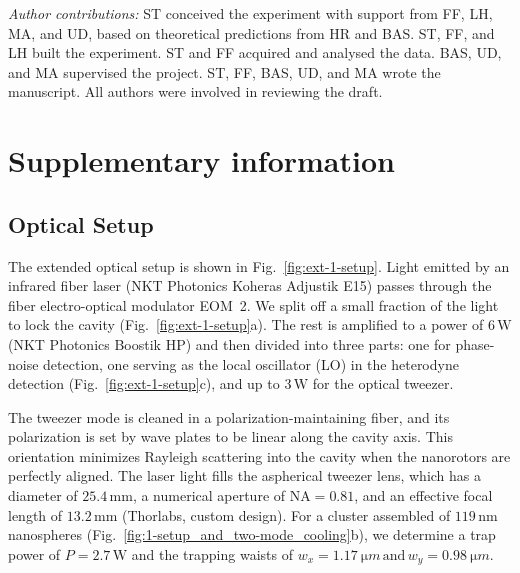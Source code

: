 \documentclass[reprint, amsmath, amssymb, superscriptaddress,showkeys,aps,pra]{revtex4-2}
\begin{document}
\noindent
\textit{Author contributions:}
ST conceived the experiment with support from FF, LH, MA, and UD, based on theoretical predictions from HR and BAS. ST, FF, and LH built the experiment. ST and FF acquired and analysed the data. BAS, UD, and MA supervised the project. ST, FF, BAS, UD, and MA wrote the manuscript. All authors were involved in reviewing the draft.
  





\onecolumngrid
\newpage
\section*{Supplementary information}

\subsection{Optical Setup}
The extended optical setup is shown in Fig.~\ref{fig:ext-1-setup}. 
Light emitted by an infrared fiber laser (NKT Photonics Koheras Adjustik E15) passes through the fiber electro-optical modulator EOM~2. 
We split off a small fraction of the light to lock the cavity (Fig.~\ref{fig:ext-1-setup}a). The rest is amplified to a power of $6\,\text{W}$ (NKT Photonics Boostik HP) and then divided into three parts:  one for phase-noise detection, one serving as the local oscillator (LO) in the heterodyne detection (Fig.~\ref{fig:ext-1-setup}c), and up to $3\,\text{W}$ for the optical tweezer.

The tweezer mode is cleaned in a polarization-maintaining fiber, and its polarization is set by wave plates to be linear along the cavity axis. This orientation minimizes Rayleigh scattering into the cavity when the nanorotors are perfectly aligned. The laser light fills the aspherical tweezer lens, which has a 
diameter of $25.4\,\text{mm}$, a numerical aperture of $\text{NA} =0.81$, and an effective focal length of $13.2\,\text{mm}$ (Thorlabs, custom design). For a cluster assembled of $119\,\text{nm}$ nanospheres (Fig.~\ref{fig:1-setup_and_two-mode_cooling}b), we determine a trap power of $P=2.7\,\text{W}$ and the trapping waists of $w_x=\qty{1.17}{\micro m} \mathrm{\,and\,}  w_y=\qty{0.98}{\micro m}$.
\end{document}
